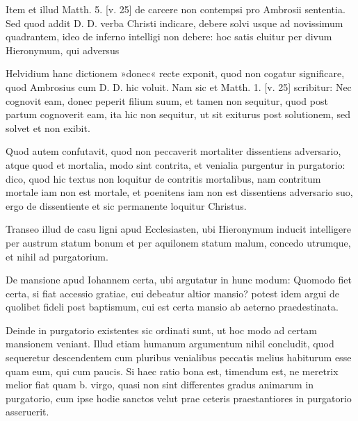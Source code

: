 Item et illud Matth. 5. [v. 25] de carcere non contempsi pro Ambrosii sententia. Sed quod addit D. D. verba Christi indicare, debere solvi usque ad novissimum quadrantem, ideo de inferno intelligi non debere: hoc satis eluitur per divum Hieronymum, qui adversus

Helvidium hanc dictionem »donec« recte exponit, quod non cogatur significare, quod Ambrosius cum D. D. hic voluit. Nam sic et Matth. 1. [v. 25] scribitur: Nec cognovit eam, donec peperit filium suum, et tamen non sequitur, quod post partum cognoverit eam, ita hic non sequitur, ut sit exiturus post solutionem, sed solvet et non exibit.

Quod autem confutavit, quod non peccaverit mortaliter dissentiens adversario, atque quod et mortalia, modo sint contrita, et venialia purgentur in purgatorio: dico, quod hic textus non loquitur de contritis mortalibus, nam contritum mortale iam non est mortale, et poenitens iam non est dissentiens adversario suo, ergo de dissentiente et sic permanente loquitur Christus.

Transeo illud de casu ligni apud Ecclesiasten, ubi Hieronymum inducit intelligere per austrum statum bonum et per aquilonem statum malum, concedo utrumque, et nihil ad purgatorium.

De mansione apud Iohannem certa, ubi argutatur in hunc modum: Quomodo fiet certa, si fiat accessio gratiae, cui debeatur altior mansio? potest idem argui de quolibet fideli post baptismum, cui est certa mansio ab aeterno praedestinata.

Deinde in purgatorio existentes sic ordinati sunt, ut hoc modo ad certam mansionem veniant. Illud etiam humanum argumentum nihil concludit, quod sequeretur descendentem cum pluribus venialibus peccatis melius habiturum esse quam eum, qui cum paucis. Si haec ratio bona est, timendum est, ne meretrix melior fiat quam b. virgo, quasi non sint differentes gradus animarum in purgatorio, cum ipse hodie sanctos velut prae ceteris praestantiores in purgatorio asseruerit.

